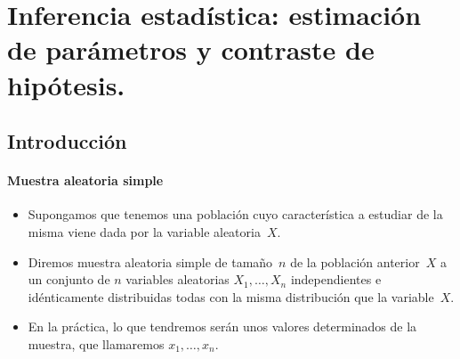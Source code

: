  

\chapter{Inferencia estadística: estimación de parámetros y contraste de hipótesis.}


\section{Introducción}

\begin{frame}
\frametitle{Muestra aleatoria simple}
\begin{itemize}
\item  Supongamos que tenemos una población cuyo característica a estudiar de la misma viene dada por la variable aleatoria~$X$.
 
\item Diremos muestra aleatoria simple de tamaño~$n$ de la población anterior~$X$ a un conjunto de $n$ variables aleatorias $X_1,\ldots,X_n$
independientes e idénticamente distribuidas todas con la misma distribución que la variable~$X$.

\item En la práctica, lo que tendremos serán unos valores determinados de la muestra, que llamaremos $x_1,\ldots,x_n$.
\end{itemize}
\end{frame}

